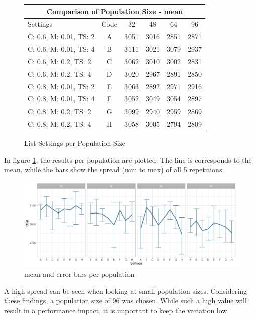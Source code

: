 \begin{figure}[ht]
	\centering
\begin{tabular}{ |l|c||c|c|c|c|  }
	\hline
	\multicolumn{6}{|c|}{Comparison of Population Size - mean} \\
	\hline
	Settings & Code & 32 & 48 & 64 & 96\\
	\hline
	C: 0.6, M: 0.01, TS: 2   	& A & 3051 & 3016 & 2851 & 2871\\
	C: 0.6, M: 0.01, TS: 4		& B & 3111 & 3021 & 3079 & 2937\\
	C: 0.6, M: 0.2, TS: 2 		& C & 3062 & 3010 & 3002 & 2831\\
	C: 0.6, M: 0.2, TS: 4    	& D & 3020 & 2967 & 2891 & 2850\\
	C: 0.8, M: 0.01, TS: 2   	& E & 3063 & 2892 & 2971 & 2916\\
	C: 0.8, M: 0.01, TS: 4		& F & 3052 & 3049 & 3054 & 2897\\
	C: 0.8, M: 0.2, TS: 2 		& G & 3099 & 2940 & 2959 & 2869\\
	C: 0.8, M: 0.2, TS: 4    	& H & 3058 & 3005 & 2794 & 2809\\
	\hline
\end{tabular}
\caption{List Settings per Population Size}
\end{figure}


In figure \ref{figure:population:results}, the results per population are plotted. The line is corresponds to the mean, while the bars show the spread (min to max) of all 5 repetitions.
\begin{figure}[ht] 
	\includegraphics[width=1\linewidth]{simulations/population/plots/comparison}
	\caption{mean and error bars per population}
		\label{figure:population:results}
\end{figure}


A high spread can be seen when looking at small population sizes. Considering these findings, a population size of 96 was chosen. While such a high value will result in a performance impact, it is important to keep the variation low.


